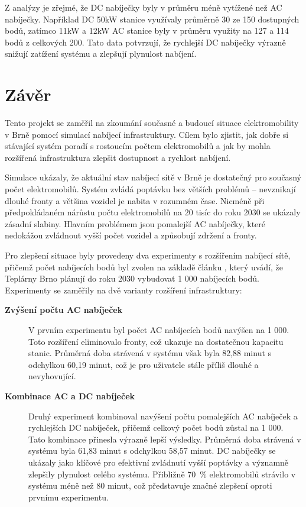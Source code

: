 \documentclass[a4paper,11pt]{article}
\begin{document}
Z analýzy je zřejmé, že DC nabíječky byly v průměru méně vytížené než AC nabíječky. Například DC 50kW stanice využívaly průměrně 30 ze 150 dostupných bodů, zatímco 11kW a 12kW AC stanice byly v průměru využity na 127 a 114 bodů z celkových 200. Tato data potvrzují, že rychlejší DC nabíječky výrazně snižují zatížení systému a zlepšují plynulost nabíjení.

\section{Závěr}
Tento projekt se zaměřil na zkoumání současné a budoucí situace elektromobility v Brně pomocí simulací nabíjecí infrastruktury. Cílem bylo zjistit, jak dobře si stávající systém poradí s rostoucím počtem elektromobilů a jak by mohla rozšířená infrastruktura zlepšit dostupnost a rychlost nabíjení.

Simulace ukázaly, že aktuální stav nabíjecí sítě v Brně je dostatečný pro současný počet elektromobilů. Systém zvládá poptávku bez větších problémů -- nevznikají dlouhé fronty a většina vozidel je nabita v rozumném čase. Nicméně při předpokládaném nárůstu počtu elektromobilů na 20 tisíc do roku 2030 se ukázaly zásadní slabiny. Hlavním problémem jsou pomalejší AC nabíječky, které nedokážou zvládnout vyšší počet vozidel a způsobují zdržení a fronty.

Pro zlepšení situace byly provedeny dva experimenty s rozšířením nabíjecí sítě, přičemž počet nabíjecích bodů byl zvolen na základě článku \cite{ev_growth}, který uvádí, že Teplárny Brno plánují do roku 2030 vybudovat 1 000 nabíjecích bodů. Experimenty se zaměřily na dvě varianty rozšíření infrastruktury:

\begin{description}
    \item[\textbf{Zvýšení počtu AC nabíječek}] V prvním experimentu byl počet AC nabíjecích bodů navýšen na 1 000. Toto rozšíření eliminovalo fronty, což ukazuje na dostatečnou kapacitu stanic. Průměrná doba strávená v systému však byla 82,88 minut s odchylkou 60,19 minut, což je pro uživatele stále příliš dlouhé a nevyhovující.
    \item[\textbf{Kombinace AC a DC nabíječek}] Druhý experiment kombinoval navýšení počtu pomalejších AC nabíječek a rychlejších DC nabíječek, přičemž celkový počet bodů zůstal na 1 000. Tato kombinace přinesla výrazně lepší výsledky. Průměrná doba strávená v systému byla 61,83 minut s odchylkou 58,57 minut. DC nabíječky se ukázaly jako klíčové pro efektivní zvládnutí vyšší poptávky a významně zlepšily plynulost celého systému. Přibližně 70~\% elektromobilů strávilo v systému méně než 80 minut, což představuje značné zlepšení oproti prvnímu experimentu.
\end{description}
\end{document}
